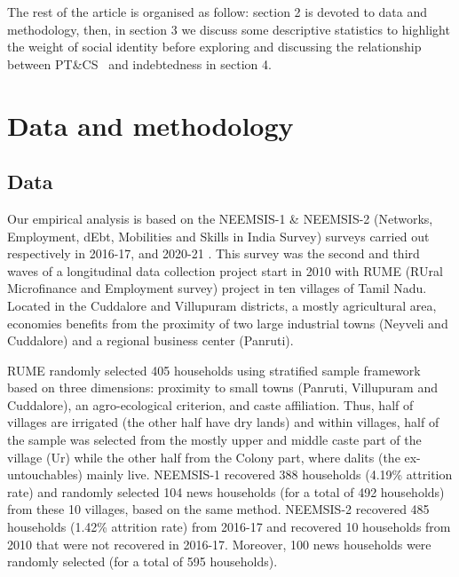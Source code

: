 \documentclass[a4paper, 11pt, onecolumn]{article}
\newcommand{\PTCS}{PT\&CS}
\begin{document}
The rest of the article is organised as follow: section 2 is devoted to data and methodology, then, in section 3 we discuss some descriptive statistics to highlight the weight of social identity before exploring and discussing the relationship between \PTCS~ and indebtedness in section 4.



\section{Data and methodology}


	\subsection{Data}
	\label{subsection:data}

Our empirical analysis is based on the NEEMSIS-1 \& NEEMSIS-2 (Networks, Employment, dEbt, Mobilities and Skills in India Survey) surveys carried out respectively in 2016-17, and 2020-21 \citep{NEEMSISreport, NEEMSIS2017}.
This survey was the second and third waves of a longitudinal data collection project start in 2010 with RUME (RUral Microfinance and Employment survey) project in ten villages of Tamil Nadu.
Located in the Cuddalore and Villupuram districts, a mostly agricultural area, economies benefits from the proximity of two large industrial towns (Neyveli and Cuddalore) and a regional business center (Panruti).

RUME randomly selected 405 households using stratified sample framework based on three dimensions: proximity to small towns (Panruti, Villupuram and Cuddalore), an agro-ecological criterion, and caste affiliation.
Thus, half of villages are irrigated (the other half have dry lands) and within villages, half of the sample was selected from the mostly upper and middle caste part of the village (Ur) while the other half from the Colony part, where dalits (the ex-untouchables)  mainly live. 
NEEMSIS-1 recovered 388 households (4.19\% attrition rate) and randomly selected 104 news households (for a total of 492 households) from these 10 villages, based on the same method. 
NEEMSIS-2 recovered 485 households (1.42\% attrition rate) from 2016-17 and recovered 10 households from 2010 that were not recovered in 2016-17.
Moreover, 100 news households were randomly selected (for a total of 595 households).
\end{document}
